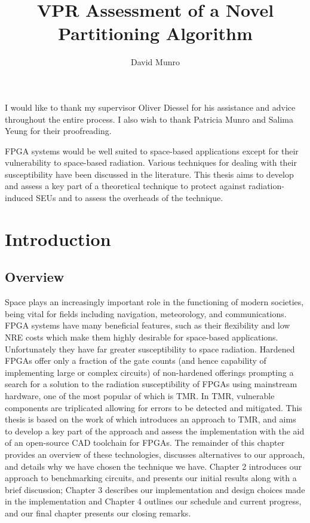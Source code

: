 \documentclass[12pt,final,oneside]{dwThesis} %
\title{VPR Assessment of a Novel Partitioning Algorithm}
\author{David Munro}
\begin{document}
   \maketitle
   \begin{acknowledgements}
      I would like to thank my supervisor Oliver Diessel for his assistance and advice throughout the entire process. I also wish to thank Patricia Munro and Salima Yeung for their proofreading.

   \end{acknowledgements}
   \begin{abstracts}
      \gls{FPGA} systems would be well suited to space-based applications except for their vulnerability to space-based radiation. Various techniques for dealing with their susceptibility have been discussed in the literature. This thesis aims to develop and assess a key part of a theoretical technique to protect against radiation-induced \glspl{SEU} and to assess the overheads of the technique.
      \glsresetall
   \end{abstracts}
   \newpage
   \tableofcontents*
   \newpage
   \printglossaries
   \chapter{Introduction}
   \section{Overview}
   Space plays an increasingly important role in the functioning of modern societies, being vital for fields including navigation, meteorology, and communications\cite{OECDSpace}. \gls{FPGA} systems have many beneficial features, such as their flexibility and low \gls{NRE} costs which make them highly desirable for space-based applications. Unfortunately they have far greater susceptibility to space radiation. Hardened \glspl{FPGA} offer only a fraction of the gate counts (and hence capability of implementing large or complex circuits) of non-hardened offerings prompting a search for a solution to the radiation susceptibility of \glspl{FPGA} using mainstream hardware\cite{VFPGATMR}, one of the most popular of which is \gls{TMR}. In \gls{TMR}, vulnerable components are triplicated allowing for errors to be detected and mitigated. This thesis is based on the work of\cite{DiesselChange} which introduces an approach to \gls{TMR}, and aims to develop a key part of the approach and assess the implementation with the aid of an open-source \gls{CAD} toolchain for \glspl{FPGA}.
   The remainder of this chapter provides an overview of these technologies, discusses alternatives to our approach, and details why we have chosen the technique we have. Chapter 2 introduces our approach to benchmarking circuits, and presents our initial results along with a brief discussion; Chapter 3 describes our implementation and design choices made in the implementation and Chapter 4 outlines our schedule and current progress, and our final chapter presents our closing remarks.
   \glsresetall
\end{document}
